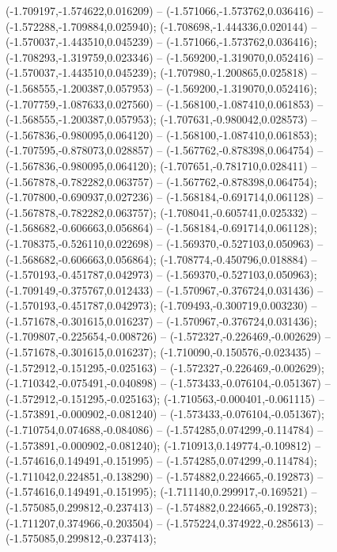  (-1.709197,-1.574622,0.016209) -- (-1.571066,-1.573762,0.036416) -- (-1.572288,-1.709884,0.025940);
 (-1.708698,-1.444336,0.020144) -- (-1.570037,-1.443510,0.045239) -- (-1.571066,-1.573762,0.036416);
 (-1.708293,-1.319759,0.023346) -- (-1.569200,-1.319070,0.052416) -- (-1.570037,-1.443510,0.045239);
 (-1.707980,-1.200865,0.025818) -- (-1.568555,-1.200387,0.057953) -- (-1.569200,-1.319070,0.052416);
 (-1.707759,-1.087633,0.027560) -- (-1.568100,-1.087410,0.061853) -- (-1.568555,-1.200387,0.057953);
 (-1.707631,-0.980042,0.028573) -- (-1.567836,-0.980095,0.064120) -- (-1.568100,-1.087410,0.061853);
 (-1.707595,-0.878073,0.028857) -- (-1.567762,-0.878398,0.064754) -- (-1.567836,-0.980095,0.064120);
 (-1.707651,-0.781710,0.028411) -- (-1.567878,-0.782282,0.063757) -- (-1.567762,-0.878398,0.064754);
 (-1.707800,-0.690937,0.027236) -- (-1.568184,-0.691714,0.061128) -- (-1.567878,-0.782282,0.063757);
 (-1.708041,-0.605741,0.025332) -- (-1.568682,-0.606663,0.056864) -- (-1.568184,-0.691714,0.061128);
 (-1.708375,-0.526110,0.022698) -- (-1.569370,-0.527103,0.050963) -- (-1.568682,-0.606663,0.056864);
 (-1.708774,-0.450796,0.018884) -- (-1.570193,-0.451787,0.042973) -- (-1.569370,-0.527103,0.050963);
 (-1.709149,-0.375767,0.012433) -- (-1.570967,-0.376724,0.031436) -- (-1.570193,-0.451787,0.042973);
 (-1.709493,-0.300719,0.003230) -- (-1.571678,-0.301615,0.016237) -- (-1.570967,-0.376724,0.031436);
 (-1.709807,-0.225654,-0.008726) -- (-1.572327,-0.226469,-0.002629) -- (-1.571678,-0.301615,0.016237);
 (-1.710090,-0.150576,-0.023435) -- (-1.572912,-0.151295,-0.025163) -- (-1.572327,-0.226469,-0.002629);
 (-1.710342,-0.075491,-0.040898) -- (-1.573433,-0.076104,-0.051367) -- (-1.572912,-0.151295,-0.025163);
 (-1.710563,-0.000401,-0.061115) -- (-1.573891,-0.000902,-0.081240) -- (-1.573433,-0.076104,-0.051367);
 (-1.710754,0.074688,-0.084086) -- (-1.574285,0.074299,-0.114784) -- (-1.573891,-0.000902,-0.081240);
 (-1.710913,0.149774,-0.109812) -- (-1.574616,0.149491,-0.151995) -- (-1.574285,0.074299,-0.114784);
 (-1.711042,0.224851,-0.138290) -- (-1.574882,0.224665,-0.192873) -- (-1.574616,0.149491,-0.151995);
 (-1.711140,0.299917,-0.169521) -- (-1.575085,0.299812,-0.237413) -- (-1.574882,0.224665,-0.192873);
 (-1.711207,0.374966,-0.203504) -- (-1.575224,0.374922,-0.285613) -- (-1.575085,0.299812,-0.237413);
